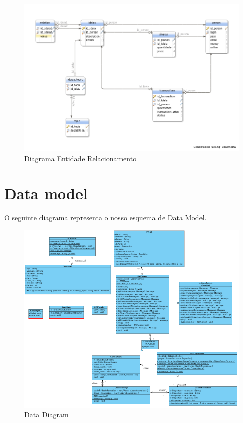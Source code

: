 \documentclass[12pt]{article} %
\begin{document}
\begin{figure}[ht]
  	\centering
  	\includegraphics[scale=0.5]{ERdiagram.png}
  	\caption{Diagrama Entidade Relacionamento}
	\label{figure3}
\end{figure}

\-
\pagebreak


\section{Data model} %
\label{sec:data}
O seguinte diagrama representa o nosso esquema de Data Model.

\begin{figure}[!ht]
  	\centering
  	\includegraphics[scale=0.6]{ClassDiagram.png}
  	\caption{Data Diagram}
	\label{figure4}
\end{figure}
\end{document}
